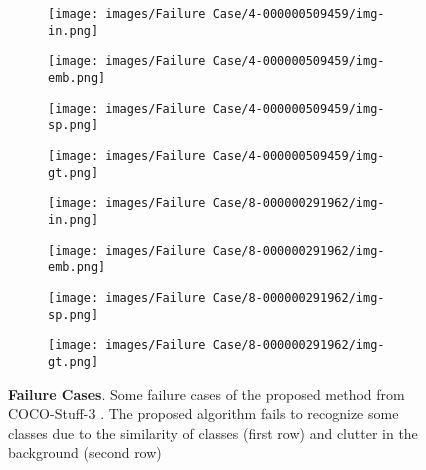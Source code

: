 \documentclass[letterpaper, 10 pt, journal, twoside]{IEEEtran}
\begin{document}
\begin{figure}[!tb]
    \centering
    \begin{subfigure}[t]{0.11\textwidth}
      \texttt{[image: images/Failure Case/4-000000509459/img-in.png]}
    \end{subfigure}
    \begin{subfigure}[t]{0.11\textwidth}
      \texttt{[image: images/Failure Case/4-000000509459/img-emb.png]}
     \end{subfigure}
    \begin{subfigure}[t]{0.11\textwidth}
      \texttt{[image: images/Failure Case/4-000000509459/img-sp.png]}
    \end{subfigure}
    \begin{subfigure}[t]{0.11\textwidth}
      \texttt{[image: images/Failure Case/4-000000509459/img-gt.png]}
    \end{subfigure}
    
    \par\smallskip
    \centering
    \begin{subfigure}[t]{0.11\textwidth}
      \texttt{[image: images/Failure Case/8-000000291962/img-in.png]}
    \end{subfigure}
    \begin{subfigure}[t]{0.11\textwidth}
      \texttt{[image: images/Failure Case/8-000000291962/img-emb.png]}
     \end{subfigure}
    \begin{subfigure}[t]{0.11\textwidth}
      \texttt{[image: images/Failure Case/8-000000291962/img-sp.png]}
    \end{subfigure}
    \begin{subfigure}[t]{0.11\textwidth}
      \texttt{[image: images/Failure Case/8-000000291962/img-gt.png]}
    \end{subfigure}
    \caption{\textbf{Failure Cases}. Some failure cases of the proposed method from COCO-Stuff-3 \cite{Cocostuff}. The proposed algorithm fails to recognize some classes due to the similarity of classes (first row) and clutter in the background (second row)}
    \label{fig:failure:coco-st3}
\end{figure}
\end{document}
